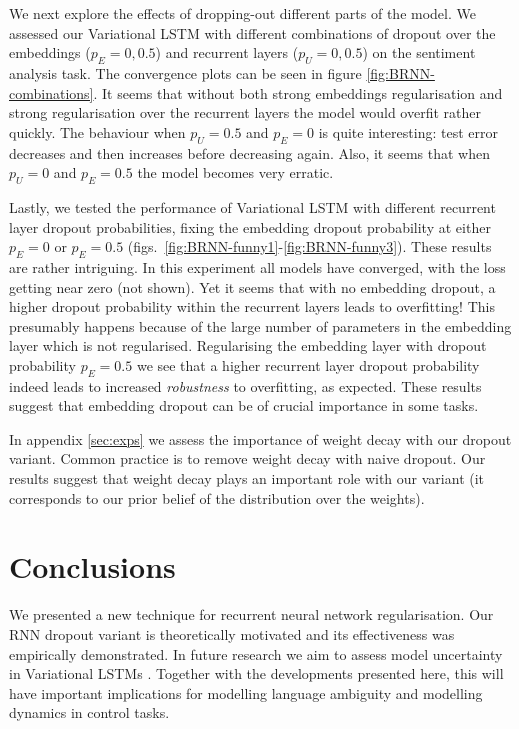 \documentclass{article}
\theoremstyle{definition}
\begin{document}
We next explore the effects of dropping-out different parts of the model. 
We assessed our Variational LSTM with different combinations of dropout over the embeddings  ($p_E=0, 0.5$) and recurrent layers ($p_U=0, 0.5$) on the sentiment analysis task. The convergence plots can be seen in figure \ref{fig:BRNN-combinations}. It seems that without both strong embeddings regularisation and strong regularisation over the recurrent layers the model would overfit rather quickly. The behaviour when $p_U=0.5$ and $p_E=0$ is quite interesting: test error decreases and then increases before decreasing again. Also, it seems that when $p_U=0$ and $p_E=0.5$ the model becomes very erratic.

Lastly, we tested the performance of Variational LSTM with different recurrent layer dropout probabilities, fixing the embedding dropout probability at either $p_E=0$ or $p_E=0.5$ (figs.\ \ref{fig:BRNN-funny1}-\ref{fig:BRNN-funny3}). These results are rather intriguing. In this experiment all models have converged, with the loss getting near zero (not shown).
Yet it seems that with no embedding dropout, a higher dropout probability within the recurrent layers leads to overfitting! This presumably happens because of the large number of parameters in the embedding layer which is not regularised. Regularising the embedding layer with dropout probability $p_E=0.5$ we see that a higher recurrent layer dropout probability indeed leads to increased \textit{robustness} to overfitting, as expected. These results suggest that embedding dropout can be of crucial importance in some tasks.

In appendix \ref{sec:exps} we assess the importance of weight decay with our dropout variant. Common practice is to remove weight decay with naive dropout. Our results suggest that weight decay plays an important role with our variant (it corresponds to our prior belief of the distribution over the weights). 





\section{Conclusions}
We presented a new technique for recurrent neural network regularisation. Our RNN dropout variant is theoretically motivated and its effectiveness was empirically demonstrated.
In future research we aim to assess model uncertainty in Variational LSTMs \citep{Gal2015DropoutB}. Together with the developments presented here, this will have important implications for modelling language ambiguity and modelling dynamics in control tasks.
\end{document}
